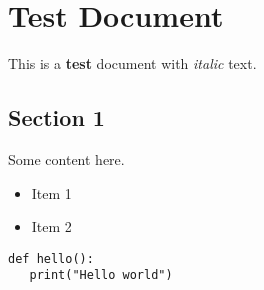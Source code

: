 \documentclass[a4paper, 12pt, twoside]{article}
\begin{document}
\section{Test Document}

This is a \textbf{test} document with \textit{italic} text.
\subsection{Section 1}

Some content here.

\begin{itemize}
\item Item 1
\item Item 2 
\end{itemize}

\begin{listing}[h!]
   \begin{verbatim}
def hello():
   print("Hello world")

   \end{verbatim}
\end{listing}

\clearpage
\tableofcontents
\end{document}

